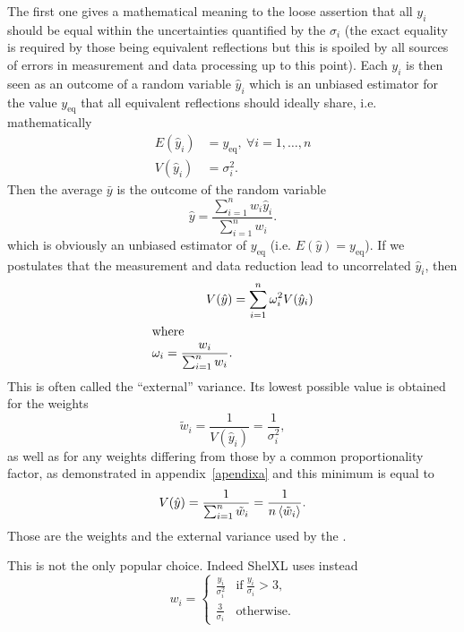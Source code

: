 \documentclass[11pt]{article}
\begin{document}
The first one gives a mathematical meaning to the loose assertion that all $y_i$ should be equal within the uncertainties quantified by the $\sigma_i$ (the exact equality is required by those being equivalent reflections but this is spoiled by all sources of errors in measurement and data processing up to this point). Each $y_i$ is then seen as an outcome of a random variable $\hat{y}_i$ which is an unbiased estimator for the value $y_{\text{eq}}$ that all equivalent reflections should ideally share, i.e. mathematically
\begin{align}
E(\hat{y}_i) &= y_{\text{eq}}, \ \forall i=1,\ldots,n\\
V(\hat{y}_i) &= \sigma_i^2 \nonumber.
\end{align}
Then the average $\bar{y}$ is the outcome of the random variable 
\begin{equation}
\hat{y} = \frac{\sum_{i=1}^n w_i \hat{y}_i}{\sum_{i=1}^n w_i} .
\end{equation}
which is obviously an unbiased estimator of $y_{\text{eq}}$ (i.e. $E(\hat{y}) = y_{\text{eq}}$). If we postulates that the measurement and data reduction lead to uncorrelated $\hat{y}_i$, then
\begin{align}
V(\hat{y}) &=  \sum_{i=1}^n \omega_i^2 V(\hat{y}_i)\\
\intertext{where}
\omega_i = \frac{w_i}{\sum_{i=1}^n w_i}.
\label{eqn:externalvariance}
\end{align}
This is often called the ``external'' variance. Its lowest possible value is obtained for the weights
\begin{equation}
\tilde{w}_i = \frac{1}{V(\hat{y}_i)} = \frac{1}{\sigma_i^2},
\label{eqn:minimalvarianceweights}
\end{equation}
as well as for any weights differing from those by a common proportionality factor, as demonstrated in appendix~\ref{apendixa} and this minimum is equal to
\begin{equation}
V(\hat{y}) = \frac{1}{\sum_{i=1}^n \tilde{w}_i} = \frac{1}{n\left\langle \tilde{w}_i \right\rangle}.
\end{equation}
Those are the weights and the external variance used by the .

This is not the only popular choice. Indeed ShelXL \cite{SHELX:man97} uses instead
\begin{equation}
w_i = \begin{cases} 
\frac{y_i}{\sigma_i^2} & \text{if}\ \frac{y_i}{\sigma_i} > 3,\\
\frac{3}{\sigma_i} & \text{otherwise}.
\end{cases}
\end{equation}
\end{document}
